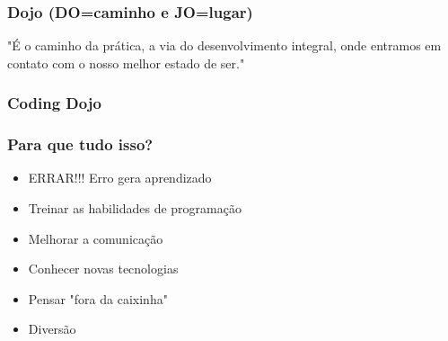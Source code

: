 \documentclass{beamer}
\begin{document}
\begin{frame}
	\frametitle{Dojo (DO=caminho e JO=lugar)}
		"É o caminho da prática, a via do desenvolvimento integral, onde entramos em contato com o nosso melhor estado de ser."
\end{frame}

\begin{frame}
	\frametitle{Coding Dojo}
\end{frame}

\begin{frame}
	\frametitle{Para que tudo isso?}
	\begin{itemize}
		\item ERRAR!!! Erro gera aprendizado
		\item Treinar as habilidades de programação
		\item Melhorar a comunicação
		\item Conhecer novas tecnologias
		\item Pensar "fora da caixinha"
		\item Diversão
	\end{itemize}
\end{frame}
\end{document}
